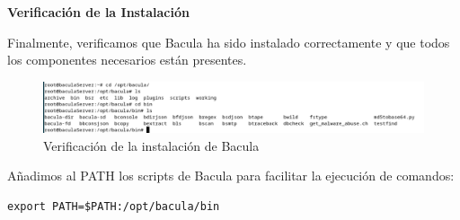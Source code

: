 \textbf{Verificación de la Instalación}\medskip

Finalmente, verificamos que Bacula ha sido instalado correctamente y que todos los componentes necesarios están presentes.

\begin{figure}[H]
    \centering
    \includegraphics[width=0.5\linewidth]{instalacionBacula/baculadir.png}
    \caption{Verificación de la instalación de Bacula}
\end{figure}

Añadimos al PATH los scripts de Bacula para facilitar la ejecución de comandos:
\begin{verbatim}
export PATH=$PATH:/opt/bacula/bin
\end{verbatim}
